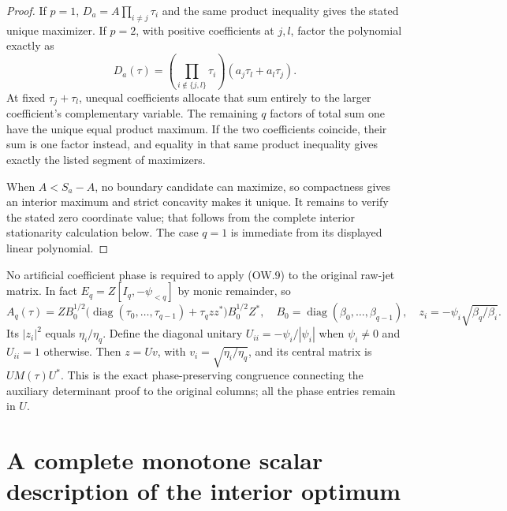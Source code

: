 \documentclass[11pt]{article}
\newcommand{\diag}{\operatorname{diag}}
\begin{document}
\begin{proof}
If $p=1$, $D_a=A\prod_{i\ne j}\tau_i$ and the same product
inequality gives the stated unique maximizer. If $p=2$, with
positive coefficients at $j,l$, factor the polynomial exactly as
\[
 D_a(\tau)=\left(\prod_{i\notin\{j,l\}}\tau_i\right)
                (a_j\tau_l+a_l\tau_j).                  \tag{OW.12}
\]
At fixed $\tau_j+\tau_l$, unequal coefficients allocate that
sum entirely to the larger coefficient's complementary variable.
The remaining $q$ factors of total sum one have the unique equal
product maximum. If the two coefficients coincide, their sum is
one factor instead, and equality in that same product inequality
gives exactly the listed segment of maximizers.

When $A<S_a-A$, no boundary candidate can maximize, so compactness
gives an interior maximum and strict concavity makes it unique.
It remains to verify the stated zero coordinate value; that follows
from the complete interior stationarity calculation below. The
case $q=1$ is immediate from its displayed linear polynomial.
\end{proof}

No artificial coefficient phase is required to apply (OW.9) to the
original raw-jet matrix. In fact $E_q=Z[I_q,-\psi_{<q}]$ by monic
remainder, so
\[
 A_q(\tau)=ZB_0^{1/2}
  \bigl(\diag(\tau_0,\ldots,\tau_{q-1})+\tau_q zz^*\bigr)
  B_0^{1/2}Z^*,\quad
 B_0=\diag(\beta_0,\ldots,\beta_{q-1}),\quad
 z_i=-\psi_i\sqrt{\beta_q/\beta_i}.                       \tag{OW.13}
\]
Its $|z_i|^2$ equals $\eta_i/\eta_q$. Define the diagonal unitary
$U_{ii}=-\psi_i/|\psi_i|$ when $\psi_i\ne0$ and $U_{ii}=1$
otherwise. Then $z=Uv$, with $v_i=\sqrt{\eta_i/\eta_q}$,
and its central matrix is $UM(\tau)U^*$. This is the exact
phase-preserving congruence connecting the auxiliary determinant
proof to the original columns; all the phase entries remain in $U$.

\section{A complete monotone scalar description of the interior optimum}
\end{document}
